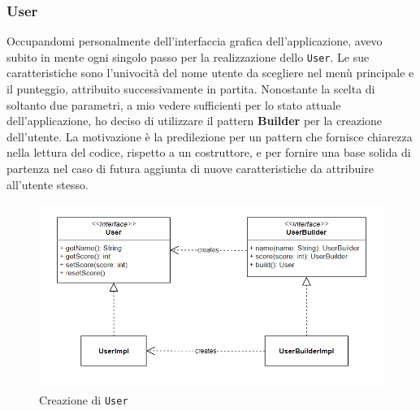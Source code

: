 \documentclass[a4paper,12pt]{report}
\begin{document}
\subsubsection{User}
Occupandomi personalmente dell'interfaccia grafica dell'applicazione, avevo subito in mente ogni singolo passo per la realizzazione dello \texttt{User}. 
Le sue caratteristiche sono l'univocità del nome utente da scegliere nel menù principale e il punteggio, attribuito successivamente in partita. Nonostante la scelta di soltanto due parametri, a mio vedere sufficienti per lo stato attuale dell'applicazione, ho deciso di utilizzare il pattern \textbf{Builder} per la creazione dell'utente. La motivazione è la predilezione per un pattern che fornisce chiarezza nella lettura del codice, rispetto a un costruttore, e per fornire una base solida di partenza nel caso di futura aggiunta di nuove caratteristiche da attribuire all'utente stesso.

\begin{figure}[H]
    \begin{center}
        \centering
        \includegraphics[width=\textwidth]{img/Severi/User.png}
    \end{center}
    \caption{Creazione di \texttt{User}}
    \label{img:user}
\end{figure}
\end{document}
